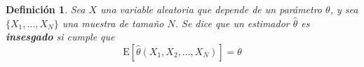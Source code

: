 \documentclass[12pt,letterpaper]{book}
\newtheorem{definicion}{Definición}[chapter]
\newtheorem{teorema}{Teorema}[chapter]
\newcommand{\E}[1]{\mathrm{E}\left[ #1 \right]}
\newcommand{\Var}[1]{\mathrm{Var}\left( #1 \right)}
\newcommand{\abso}[1]{\left| #1 \right|}
\begin{document}




\begin{definicion}
Sea $X$ una variable aleatoria que depende de un parámetro $\theta$, y sea $\{ X_1, \dots, X_N \}$ una muestra de tamaño $N$. Se dice que un estimador $\widehat{\theta}$ es \textbf{insesgado} si cumple que
\begin{equation}
\E{\widehat{\theta}(X_1,X_2,\dots,X_N)} = \theta
\end{equation}

\end{definicion}
\end{document}
